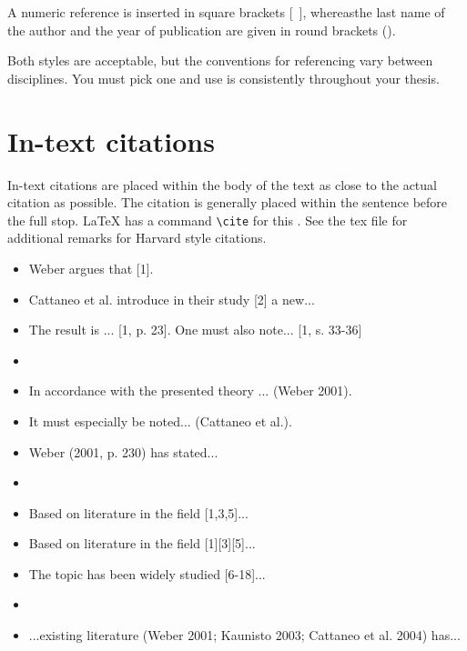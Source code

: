 \documentclass[12pt,a4paper,english
]{tunithesis}
\begin{document}
A numeric reference is inserted in square brackets [~], whereasthe last
name of the author and the year of publication are given in round
brackets ().

Both styles are acceptable, but the conventions for referencing vary
between disciplines. You must pick one and use is consistently
throughout your thesis.

\section{In-text citations}

In-text citations are placed within the body of the text as close to
the actual citation as possible. The citation is generally placed
within the sentence before the full stop. LaTeX has a command
\texttt{\textbackslash cite} for this \cite[p. 85]{oetiker14}. See the
tex file for additional remarks for Harvard style citations.
%
%



\begin{itemize}
  \setlength{\itemsep}{-10pt} %
  \small
\item[] Weber argues that [1]. 
\item[] Cattaneo et al. introduce in their study [2] a new...
\item[] The result is ... [1, p. 23]. One must also note... [1, s. 33-36]
\item[]
\item[] In accordance with the presented theory ... (Weber 2001).
\item[] It must especially be noted... (Cattaneo et al.).
\item[] Weber (2001, p. 230) has stated...
\item[]
\item[] Based on literature in the field [1,3,5]...
\item[] Based on literature in the field [1][3][5]...
\item[] The topic has been widely studied [6-18]...
\item[]
\item[] ...existing literature (Weber 2001; Kaunisto 2003; Cattaneo et al. 2004) has...
\end{itemize}
\end{document}
